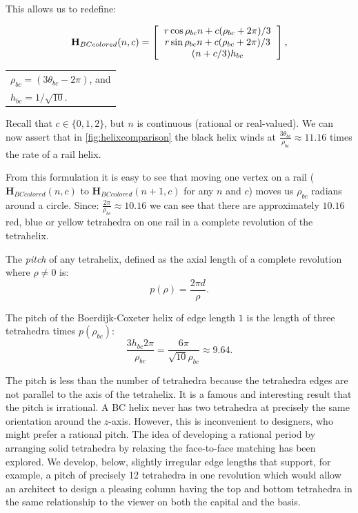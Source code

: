 \documentclass[twocolumn,10pt]{asme2ej}
\renewcommand{\vec}[1]{\mathbf{#1}}
\begin{document}
This allows us to redefine:

\begin{equation}
\vec{H}_{BCcolored}(n,c) =
\left [
  \begin{tabular}{c}
    $ r  \cos{\rho_{bc} n + c (\rho_{bc} +  2 \pi) /3} $\\
   $ r  \sin{\rho_{bc} n + c (\rho_{bc} +  2 \pi) /3} $\\
   $ (n+c/3)  h_{bc} $
  \end{tabular}
  \right ],
\end{equation}
  \begin{tabular}{l}
    $\rho_{bc} = (3 \theta_{bc} - 2 \pi)$, and \\
    $ h_{bc} = 1/\sqrt{10} $. \\    
  \end{tabular}      


Recall that $c \in \{0,1,2\}$, but $n$ is continuous (rational or real-valued).
We can now assert that in \cref{fig:helixcomparison} the black helix winds at
$\frac{3 \theta_{bc}}{\rho_{bc}} \approx 11.16 $ times the rate of a rail helix.

From this formulation it is easy to see that moving one vertex on a rail
($\vec{H}_{BCcolored}(n,c)$ to $\vec{H}_{BCcolored}(n+1,c)$ for any $n$ and $c$)
moves us $\rho_{bc}$ radians around a circle. Since:
$ \frac{2 \pi}{\rho_{bc}} \approx 10.16 $
we can see that there are approximately $10.16$ red, blue or yellow tetrahedra on one rail in a
complete revolution of the tetrahelix.

The \emph{pitch} of any tetrahelix, defined as the axial length of a complete revolution
where $\rho \neq 0$ is:
\begin{equation}
  \label{pitcheqn}
p(\rho) = \frac{2 \pi  d}{\rho} \text{.}
\end{equation}

The pitch of the Boerdijk-Coxeter helix of edge length $1$ is the length of three tetrahedra times
$p(\rho_{bc})$:
\begin{equation}
   \frac{3 h_{bc}  2 \pi }{\rho_{bc}} 
   = \frac{6 \pi}{\sqrt{10}\rho_{bc}}
   \approx 9.64
 \text{.}
\end{equation}


The pitch is less than the number of tetrahedra because the tetrahedra
edges are not parallel to the axis of the tetrahelix.  It is a famous and interesting result
that the pitch is irrational. A BC helix never has two tetrahedra at
precisely the same orientation around the $z$-axis. However, this is
inconvenient to designers, who might prefer a rational pitch.
The idea of developing a rational period by arranging solid tetrahedra by relaxing
the face-to-face matching
has been explored\cite{sadler2013periodic}. 
We develop, below, slightly irregular edge lengths that support, for example,
a pitch of precisely 12
tetrahedra in one revolution which would allow an architect to
design a pleasing column having the top and bottom tetrahedra in the same relationship to the
viewer on both the capital and the basis.
\end{document}

